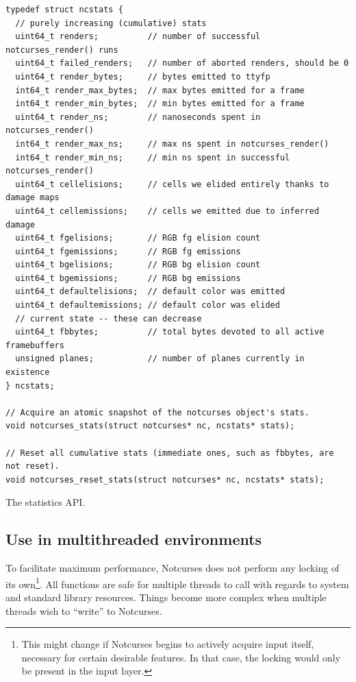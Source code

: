 \documentclass[letterpaper,10pt]{article}
\begin{document}
\begin{listing}[!htb]
\begin{verbatim}
typedef struct ncstats {
  // purely increasing (cumulative) stats
  uint64_t renders;          // number of successful notcurses_render() runs
  uint64_t failed_renders;   // number of aborted renders, should be 0
  uint64_t render_bytes;     // bytes emitted to ttyfp
  int64_t render_max_bytes;  // max bytes emitted for a frame
  int64_t render_min_bytes;  // min bytes emitted for a frame
  uint64_t render_ns;        // nanoseconds spent in notcurses_render()
  int64_t render_max_ns;     // max ns spent in notcurses_render()
  int64_t render_min_ns;     // min ns spent in successful notcurses_render()
  uint64_t cellelisions;     // cells we elided entirely thanks to damage maps
  uint64_t cellemissions;    // cells we emitted due to inferred damage
  uint64_t fgelisions;       // RGB fg elision count
  uint64_t fgemissions;      // RGB fg emissions
  uint64_t bgelisions;       // RGB bg elision count
  uint64_t bgemissions;      // RGB bg emissions
  uint64_t defaultelisions;  // default color was emitted
  uint64_t defaultemissions; // default color was elided
  // current state -- these can decrease
  uint64_t fbbytes;          // total bytes devoted to all active framebuffers
  unsigned planes;           // number of planes currently in existence
} ncstats;

// Acquire an atomic snapshot of the notcurses object's stats.
void notcurses_stats(struct notcurses* nc, ncstats* stats);

// Reset all cumulative stats (immediate ones, such as fbbytes, are not reset).
void notcurses_reset_stats(struct notcurses* nc, ncstats* stats);
\end{verbatim}
\caption{The statistics API.}
\label{list:stats}
\end{listing}

\subsection{Use in multithreaded environments}
\label{sec:fullthreads}
To facilitate maximum performance, Notcurses does not perform any locking of
its own\footnote{This might change if Notcurses begins to actively acquire
input itself, necessary for certain desirable features. In that case, the
locking would only be present in the input layer.}. All functions are safe
for multiple threads to call with regards to system and standard library
resources. Things become more complex when multiple threads wish to ``write''
to Notcurses.
\end{document}
